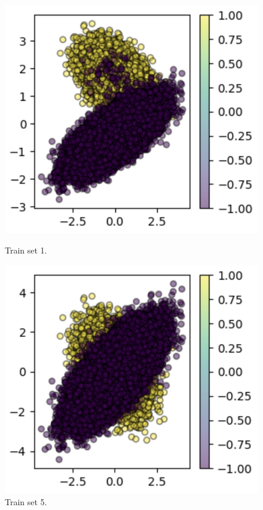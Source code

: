\begin{figure}[h!]
    \centering
    \begin{minipage}{0.49\textwidth}
        \centering
        \includegraphics[width=\linewidth]{images/ds1.png}
        \caption{Train set 1.}
        \label{fig:ds1}
    \end{minipage}
    \hfill
    \begin{minipage}{0.49\textwidth}
        \centering
        \includegraphics[width=\linewidth]{images/ds5.png}
        \caption{Train set 5.}
        \label{fig:ds5}
    \end{minipage}
\end{figure}

